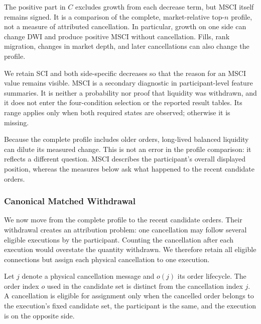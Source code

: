 \documentclass[11pt]{article}
\begin{document}
The positive part in $C$ excludes growth from each decrease term, but MSCI itself remains signed. It is a comparison of the complete, market-relative top-$n$ profile, not a measure of attributed cancellation. In particular, growth on one side can change DWI and produce positive MSCI without cancellation. Fills, rank migration, changes in market depth, and later cancellations can also change the profile.

We retain SCI and both side-specific decreases so that the reason for an MSCI value remains visible. MSCI is a secondary diagnostic in participant-level feature summaries. It is neither a probability nor proof that liquidity was withdrawn, and it does not enter the four-condition selection or the reported result tables. Its range applies only when both required states are observed; otherwise it is missing.

Because the complete profile includes older orders, long-lived balanced liquidity can dilute its measured change. This is not an error in the profile comparison: it reflects a different question. MSCI describes the participant's overall displayed position, whereas the measures below ask what happened to the recent candidate orders.

\subsubsection{Canonical Matched Withdrawal}
\label{subsec:canonical_matched_withdrawal}

We now move from the complete profile to the recent candidate orders. Their withdrawal creates an attribution problem: one cancellation may follow several eligible executions by the participant. Counting the cancellation after each execution would overstate the quantity withdrawn. We therefore retain all eligible connections but assign each physical cancellation to one execution.

Let $j$ denote a physical cancellation message and $o(j)$ its order lifecycle. The order index $o$ used in the candidate set is distinct from the cancellation index $j$. A cancellation is eligible for assignment only when the cancelled order belongs to the execution's fixed candidate set, the participant is the same, and the execution is on the opposite side.
\end{document}
